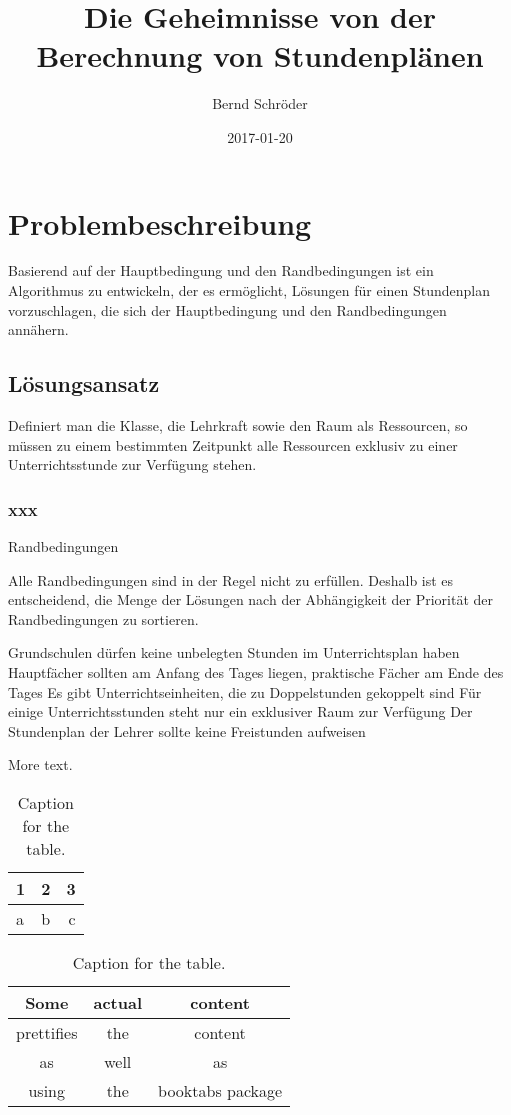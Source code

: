 \documentclass{article}
\title{Die Geheimnisse von der Berechnung von Stundenplänen}
\date{2017-01-20}
\author{Bernd Schröder}
\begin{document}
\maketitle
\newpage
{}

\section{Problembeschreibung}
Basierend auf der Hauptbedingung und den Randbedingungen ist ein Algorithmus zu entwickeln, der es ermöglicht, Lösungen für einen Stundenplan vorzuschlagen, die sich der Hauptbedingung und den Randbedingungen annähern.

\subsection{Lösungsansatz}
Definiert man die Klasse, die Lehrkraft sowie den Raum als Ressourcen, so müssen zu einem bestimmten Zeitpunkt alle Ressourcen exklusiv zu einer Unterrichtsstunde zur Verfügung stehen.



\subsubsection{xxx}
Randbedingungen

Alle Randbedingungen sind in der Regel nicht zu erfüllen. Deshalb ist es entscheidend, die Menge der Lösungen nach der Abhängigkeit der Priorität der Randbedingungen zu sortieren.

    Grundschulen dürfen keine unbelegten Stunden im Unterrichtsplan haben
    Hauptfächer sollten am Anfang des Tages liegen, praktische Fächer am Ende des Tages
    Es gibt Unterrichtseinheiten, die zu Doppelstunden gekoppelt sind
    Für einige Unterrichtsstunden steht nur ein exklusiver Raum zur Verfügung
    Der Stundenplan der Lehrer sollte keine Freistunden aufweisen


More text.

\begin{table}[h!]
  \centering
  \caption{Caption for the table.}
  \label{tab:table1}
  \begin{tabular}{l|c||r}
    1 & 2 & 3\\
    \hline
    a & b & c\\
  \end{tabular}
\end{table}

\begin{table}[h!]
  \centering
  \caption{Caption for the table.}
  \label{tab:table1}
  \begin{tabular}{ccc}
    \toprule
    Some & actual & content\\
    \midrule
    prettifies & the & content\\
    as & well & as\\
    using & the & booktabs package\\
    \bottomrule
  \end{tabular}
\end{table}
\end{document}
